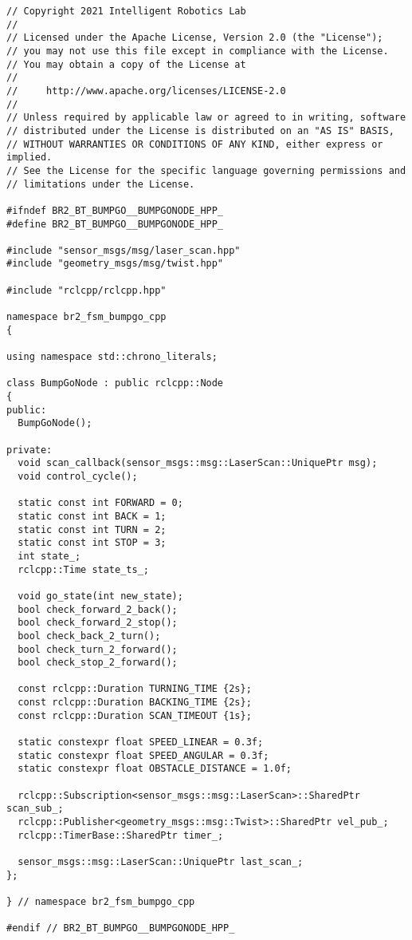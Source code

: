  \footnotesize
\begin{tcolorbox}[sharp corners, colframe=gray!80, colback=LightGray, left=0pt, top=0pt, bottom=0pt, title=\texttt{br2\_fsm\_bumpgo\_cpp/include/br2\_fsm\_bumpgo\_cpp/BumpGoNode.hpp}]
  \begin{verbatim}
// Copyright 2021 Intelligent Robotics Lab
//
// Licensed under the Apache License, Version 2.0 (the "License");
// you may not use this file except in compliance with the License.
// You may obtain a copy of the License at
//
//     http://www.apache.org/licenses/LICENSE-2.0
//
// Unless required by applicable law or agreed to in writing, software
// distributed under the License is distributed on an "AS IS" BASIS,
// WITHOUT WARRANTIES OR CONDITIONS OF ANY KIND, either express or implied.
// See the License for the specific language governing permissions and
// limitations under the License.

#ifndef BR2_BT_BUMPGO__BUMPGONODE_HPP_
#define BR2_BT_BUMPGO__BUMPGONODE_HPP_ 

#include "sensor_msgs/msg/laser_scan.hpp" 
#include "geometry_msgs/msg/twist.hpp" 

#include "rclcpp/rclcpp.hpp" 

namespace br2_fsm_bumpgo_cpp 
{

using namespace std::chrono_literals;

class BumpGoNode : public rclcpp::Node 
{ 
public: 
  BumpGoNode(); 

private: 
  void scan_callback(sensor_msgs::msg::LaserScan::UniquePtr msg); 
  void control_cycle(); 

  static const int FORWARD = 0; 
  static const int BACK = 1;
  static const int TURN = 2; 
  static const int STOP = 3; 
  int state_; 
  rclcpp::Time state_ts_; 

  void go_state(int new_state); 
  bool check_forward_2_back(); 
  bool check_forward_2_stop(); 
  bool check_back_2_turn(); 
  bool check_turn_2_forward(); 
  bool check_stop_2_forward(); 

  const rclcpp::Duration TURNING_TIME {2s};
  const rclcpp::Duration BACKING_TIME {2s};
  const rclcpp::Duration SCAN_TIMEOUT {1s};

  static constexpr float SPEED_LINEAR = 0.3f;
  static constexpr float SPEED_ANGULAR = 0.3f;
  static constexpr float OBSTACLE_DISTANCE = 1.0f;

  rclcpp::Subscription<sensor_msgs::msg::LaserScan>::SharedPtr scan_sub_; 
  rclcpp::Publisher<geometry_msgs::msg::Twist>::SharedPtr vel_pub_; 
  rclcpp::TimerBase::SharedPtr timer_; 

  sensor_msgs::msg::LaserScan::UniquePtr last_scan_; 
}; 

} // namespace br2_fsm_bumpgo_cpp 

#endif // BR2_BT_BUMPGO__BUMPGONODE_HPP_ 
    \end{verbatim}
    \end{tcolorbox}
  \normalsize

